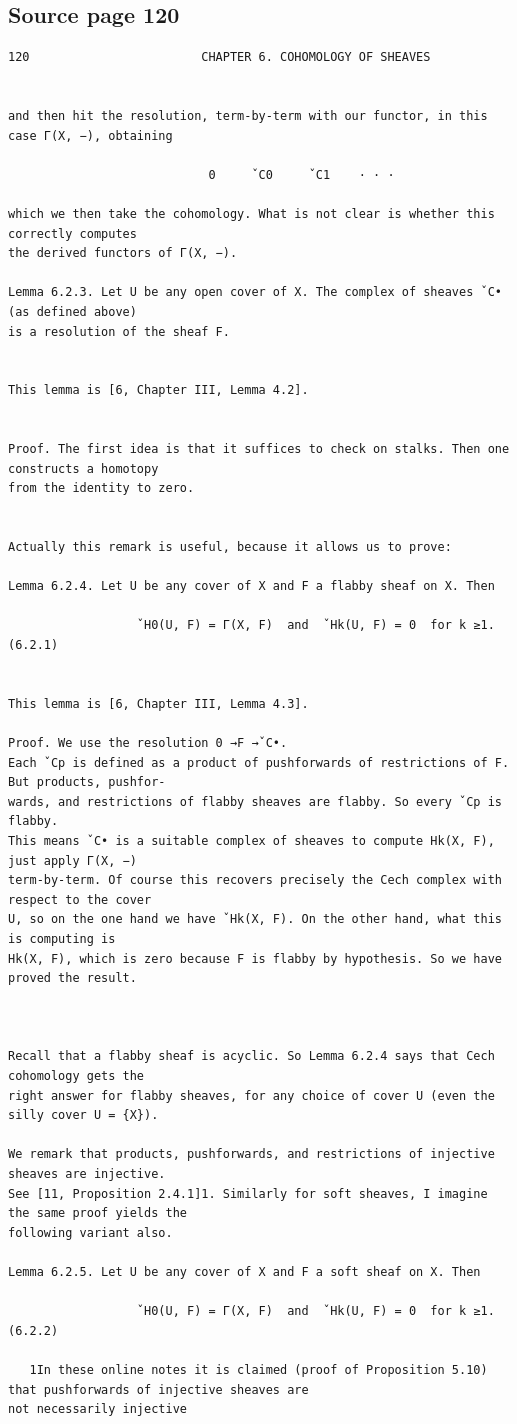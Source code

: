 \subsection*{Source page 120}
\begin{Verbatim}[fontsize=\small]
120                        CHAPTER 6. COHOMOLOGY OF SHEAVES


and then hit the resolution, term-by-term with our functor, in this case Γ(X, −), obtaining

                            0     ˇC0     ˇC1    · · ·

which we then take the cohomology. What is not clear is whether this correctly computes
the derived functors of Γ(X, −).

Lemma 6.2.3. Let U be any open cover of X. The complex of sheaves ˇC• (as defined above)
is a resolution of the sheaf F.


This lemma is [6, Chapter III, Lemma 4.2].


Proof. The first idea is that it suffices to check on stalks. Then one constructs a homotopy
from the identity to zero.


Actually this remark is useful, because it allows us to prove:

Lemma 6.2.4. Let U be any cover of X and F a flabby sheaf on X. Then

                  ˇH0(U, F) = Γ(X, F)  and  ˇHk(U, F) = 0  for k ≥1.             (6.2.1)


This lemma is [6, Chapter III, Lemma 4.3].

Proof. We use the resolution 0 →F →ˇC•.
Each ˇCp is defined as a product of pushforwards of restrictions of F. But products, pushfor-
wards, and restrictions of flabby sheaves are flabby. So every ˇCp is flabby.
This means ˇC• is a suitable complex of sheaves to compute Hk(X, F), just apply Γ(X, −)
term-by-term. Of course this recovers precisely the Cech complex with respect to the cover
U, so on the one hand we have ˇHk(X, F). On the other hand, what this is computing is
Hk(X, F), which is zero because F is flabby by hypothesis. So we have proved the result.



Recall that a flabby sheaf is acyclic. So Lemma 6.2.4 says that Cech cohomology gets the
right answer for flabby sheaves, for any choice of cover U (even the silly cover U = {X}).

We remark that products, pushforwards, and restrictions of injective sheaves are injective.
See [11, Proposition 2.4.1]1. Similarly for soft sheaves, I imagine the same proof yields the
following variant also.

Lemma 6.2.5. Let U be any cover of X and F a soft sheaf on X. Then

                  ˇH0(U, F) = Γ(X, F)  and  ˇHk(U, F) = 0  for k ≥1.             (6.2.2)

   1In these online notes it is claimed (proof of Proposition 5.10) that pushforwards of injective sheaves are
not necessarily injective
\end{Verbatim}

